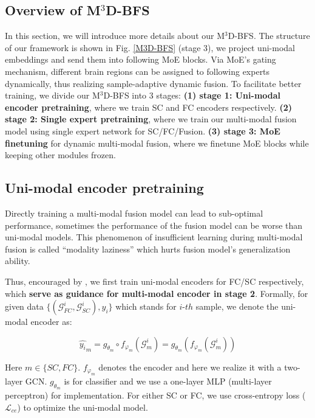 \documentclass[10pt,twocolumn,letterpaper]{article}
\begin{document}
\subsection{Overview of M$^3$D-BFS}
In this section, we will introduce more details about our M$^3$D-BFS. The structure of our framework is shown in Fig. \ref{M3D-BFS} (stage 3), we project uni-modal embeddings and send them into following MoE blocks. Via MoE's gating mechanism, different brain regions can be assigned to following experts dynamically, thus realizing sample-adaptive dynamic fusion. To facilitate better training, we divide our M$^3$D-BFS into 3 stages: \textbf{(1) stage 1: Uni-modal encoder pretraining}, where we train SC and FC encoders respectively. \textbf{(2) stage 2: Single expert pretraining}, where we train our multi-modal fusion model using single expert network for SC/FC/Fusion. \textbf{(3) stage 3: MoE finetuning} for dynamic multi-modal fusion, where we finetune MoE blocks while keeping other modules frozen. 

\subsection{Uni-modal encoder pretraining}
Directly training a multi-modal fusion model can lead to sub-optimal performance, sometimes the performance of the fusion model can be worse than uni-modal models. This phenomenon of insufficient learning during multi-modal fusion is called ``modality laziness'' \cite{du2023uni} which hurts fusion model's generalization ability. 

Thus, encouraged by \cite{du2023uni}, we first train uni-modal encoders for FC/SC respectively, which \textbf{serve as guidance for multi-modal encoder in stage 2}. Formally, for given data $\{(\mathcal{G}_{FC}^i, \mathcal{G}_{SC}^i), y_i\}$ which stands for $i\mbox{-}th$ sample, we denote the uni-modal encoder as:
\begin{small}
\begin{equation}
    \hat{y_i}_m = g_{\theta_m}\circ f_{\varphi_m}(\mathcal{G}_{m}^i) = g_{\theta_m}(f_{\varphi_m}(\mathcal{G}_{m}^i))
    \label{uni-enc}
\end{equation}
\end{small}
Here $m \in \{SC,FC\}$. $f_{\varphi_m}$ denotes the encoder and here we realize it with a two-layer GCN. $g_{\theta_m}$ is for classifier and we use a one-layer MLP (multi-layer perceptron) for implementation. For either SC or FC, we use cross-entropy loss ($\mathcal{L}_{ce}$) to optimize the uni-modal model. 
\end{document}

